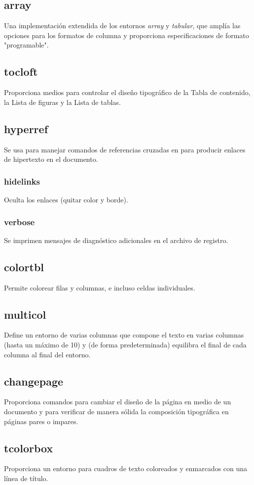\documentclass[12pt]{article}
\begin{document}
\subsection{array}
Una implementación extendida de los entornos \textit{array} y \textit{tabular}, que amplía las opciones para los formatos de columna y proporciona especificaciones de formato "programable".\cite{array}
\subsection{tocloft}
Proporciona medios para controlar el diseño tipográfico de la Tabla de contenido, la Lista de figuras y la Lista de tablas.\cite{tocloft}
\subsection{hyperref}
Se usa para manejar comandos de referencias cruzadas en  para producir enlaces de hipertexto en el documento.\cite{hyperref}
\subsubsection{hidelinks}
Oculta los enlaces (quitar color y borde).\cite{hidelinks}
\subsubsection{verbose}
Se imprimen mensajes de diagnóstico adicionales en el archivo de registro.\cite{verbose}
\subsection{colortbl}
Permite colorear filas y columnas, e incluso celdas individuales.\cite{colortbl}
\subsection{multicol}
Define un entorno de varias columnas que compone el texto en varias columnas (hasta un máximo de 10) y (de forma predeterminada) equilibra el final de cada columna al final del entorno.\cite{multicol}
\subsection{changepage}
Proporciona comandos para cambiar el diseño de la página en medio de un documento y para verificar de manera sólida la composición tipográfica en páginas pares o impares.\cite{changepage}
\subsection{tcolorbox}
Proporciona un entorno para cuadros de texto coloreados y enmarcados con una línea de título.\cite{tcolorbox}
\end{document}
